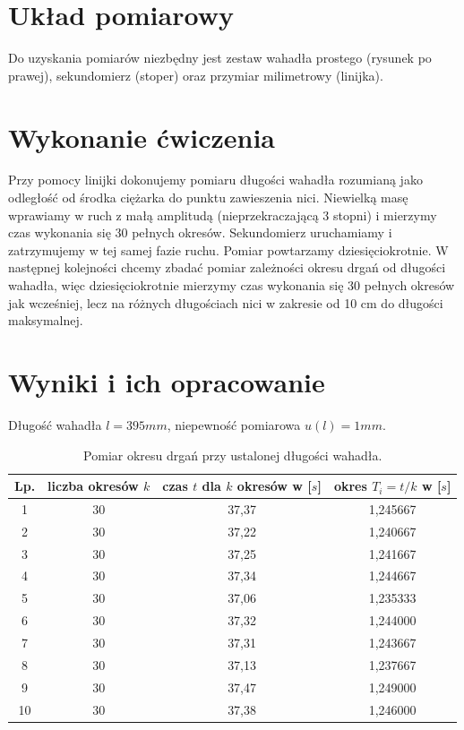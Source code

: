 \documentclass[a4paper,11pt]{article}
\begin{document}
\section{Układ pomiarowy}
Do uzyskania pomiarów niezbędny jest zestaw wahadła prostego (rysunek po prawej), sekundomierz (stoper) oraz przymiar milimetrowy (linijka).

\section{Wykonanie ćwiczenia}

Przy pomocy linijki dokonujemy pomiaru długości wahadła rozumianą jako odległość od środka ciężarka do punktu zawieszenia nici. Niewielką masę wprawiamy w ruch z małą amplitudą (nieprzekraczającą 3 stopni) i mierzymy czas wykonania się 30 pełnych okresów. Sekundomierz uruchamiamy i zatrzymujemy w tej samej fazie ruchu. Pomiar powtarzamy dziesięciokrotnie.
\newpage
W następnej kolejności chcemy zbadać pomiar zależności okresu drgań od długości wahadła, więc dziesięciokrotnie mierzymy czas wykonania się 30 pełnych okresów jak wcześniej, lecz na różnych długościach nici w zakresie od 10 cm do długości maksymalnej.
  
\section{Wyniki i ich opracowanie}

\begin{table}[ht]
\centering
\setlength{\extrarowheight}{1.5pt}
\caption{Pomiar okresu drgań przy ustalonej długości wahadła.}
Długość wahadła $l = 395 mm$, niepewność pomiarowa $u(l) = 1 mm$.
\begin{tabular}{|c|c|c|c|}
\hline
Lp. & liczba okresów $k$ & czas $t$ dla $k$ okresów w [$s$] & okres $T_{i}=t/k$ w [$s$] \\ \hline
1 & 30 & 37,37 & 1,245667\\ \hline
2 & 30 & 37,22 & 1,240667\\ \hline
3 & 30 & 37,25 & 1,241667\\ \hline
4 & 30 & 37,34 & 1,244667\\ \hline
5 & 30 & 37,06 & 1,235333\\ \hline
6 & 30 & 37,32 & 1,244000\\ \hline
7 & 30 & 37,31 & 1,243667\\ \hline
8 & 30 & 37,13 & 1,237667\\ \hline
9 & 30 & 37,47 & 1,249000\\ \hline
10 & 30 & 37,38 & 1,246000\\ \hline
\end{tabular}
\end{table}
\end{document}
